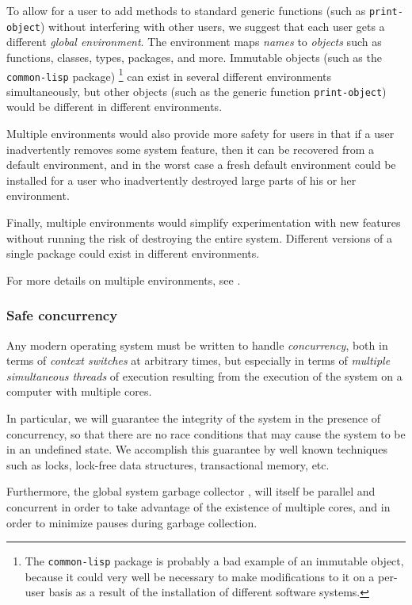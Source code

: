 To allow for a user to add methods to standard generic functions (such
as \texttt{print-object}) without interfering with other users, we
suggest that each user gets a different \emph{global environment}.
The environment maps \emph{names} to \emph{objects} such as functions,
classes, types, packages, and more.  Immutable objects (such as the
\texttt{common-lisp} package)%
\footnote{The \texttt{common-lisp} package is probably a bad example
  of an immutable object, because it could very well be necessary to
  make modifications to it on a per-user basis as a result of the
  installation of different software systems.}
can exist in several different
environments simultaneously, but other objects (such as the generic
function \texttt{print-object}) would be different in different
environments.

Multiple environments would also provide more safety for users in
that if a user inadvertently removes some system feature, then it
can be recovered from a default environment, and in the worst case a
fresh default environment could be installed for a user who
inadvertently destroyed large parts of his or her environment. 

Finally, multiple environments would simplify experimentation with
new features without running the risk of destroying the entire
system.  Different versions of a single package could exist in
different environments.

For more details on multiple environments, see
.

\subsubsection{Safe concurrency}

Any modern operating system must be written to handle
\emph{concurrency}, both in terms of \emph{context switches} at
arbitrary times, but especially in terms of \emph{multiple
  simultaneous threads} of execution resulting from the execution of
the system on a computer with multiple cores.

In particular, we will guarantee the integrity of the system in the
presence of concurrency, so that there are no race conditions that may
cause the system to be in an undefined state.  We accomplish this
guarantee by well known techniques such as locks, lock-free data
structures, transactional memory, etc.

Furthermore, the global system garbage collector
, will itself be parallel and
concurrent in order to take advantage of the existence of multiple
cores, and in order to minimize pauses during garbage collection.

